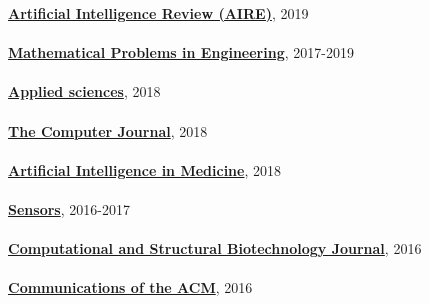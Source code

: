\href{https://link.springer.com/journal/10462}{\textbf{Artificial Intelligence Review (AIRE)}}, 2019
\\ \halfblankline \\
\href{https://www.hindawi.com/journals/mpe/}{\textbf{Mathematical Problems in Engineering}}, 2017-2019
\\ \halfblankline \\
\href{http://www.mdpi.com/journal/applsci}{\textbf{Applied sciences}}, 2018
\\ \halfblankline \\
\href{https://academic.oup.com/comjnl}{\textbf{The Computer Journal}}, 2018
\\ \halfblankline \\
\href{https://www.journals.elsevier.com/artificial-intelligence-in-medicine/}{\textbf{Artificial Intelligence in Medicine}}, 2018
\\ \halfblankline \\
\href{http://www.mdpi.com/journal/sensors}{\textbf{Sensors}}, 2016-2017
\\ \halfblankline \\
\href{https://www.journals.elsevier.com/computational-and-structural-biotechnology-journal/}{\textbf{Computational and Structural Biotechnology Journal}}, 2016
\\ \halfblankline \\
\href{http://cacm.acm.org/}{\textbf{Communications of the ACM}}, 2016
